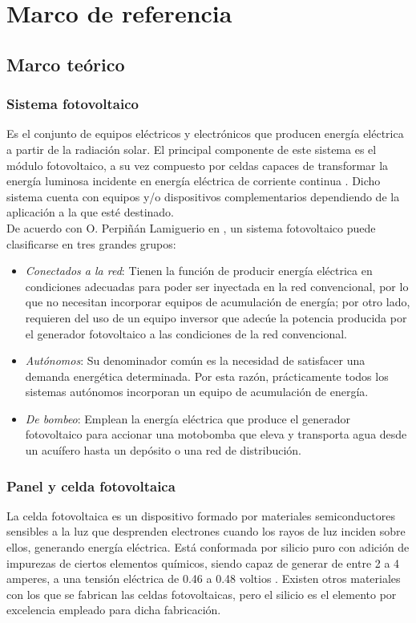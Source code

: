 \chapter{Marco de referencia}

\section{Marco teórico}
\subsection{Sistema fotovoltaico}
Es el conjunto de equipos eléctricos y electrónicos que producen energía eléctrica a partir de la radiación solar. El principal componente de este sistema es el módulo fotovoltaico, a su vez compuesto por celdas capaces de transformar la energía luminosa incidente en energía eléctrica de corriente continua \cite{M1}. Dicho sistema cuenta con equipos y/o dispositivos complementarios dependiendo de la aplicación a la que esté destinado.\\

De acuerdo con O. Perpiñán Lamiguerio en \cite{M1}, un sistema fotovoltaico puede clasificarse en tres grandes grupos:

\begin{itemize}
	\item \textit{Conectados a la red}: Tienen la función de producir energía eléctrica en condiciones adecuadas para poder ser inyectada en la red convencional, por lo que no necesitan incorporar equipos de acumulación de energía; por otro lado, requieren del uso de un equipo inversor que adecúe la potencia producida por el generador fotovoltaico a las condiciones de la red convencional.
	\item \textit{Autónomos}: Su denominador común es la necesidad de satisfacer una demanda energética determinada. Por esta razón, prácticamente todos los sistemas autónomos incorporan un equipo de acumulación de energía.
	\item \textit{De bombeo}: Emplean la energía eléctrica que produce el generador fotovoltaico para accionar una motobomba que eleva y transporta agua desde un acuífero hasta un depósito o una red de distribución.
\end{itemize}

\subsection{Panel y celda fotovoltaica}
La celda fotovoltaica es un dispositivo formado por materiales semiconductores sensibles a la luz que desprenden electrones cuando los rayos de luz inciden sobre ellos, generando energía eléctrica. Está conformada por silicio puro con adición de impurezas de ciertos elementos químicos, siendo capaz de generar de entre 2 a 4 amperes, a una tensión eléctrica de 0.46 a 0.48 voltios \cite{M2:2019:Online}. Existen otros materiales con los que se fabrican las celdas fotovoltaicas, pero el silicio es el elemento por excelencia empleado para dicha fabricación. \\

